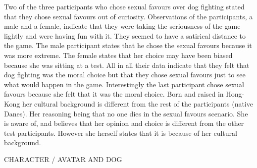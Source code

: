 Two of the three participants who chose sexual favours over dog fighting stated that they chose sexual favours out of curiosity. Observations of the participants, a male and a female, indicate that they were taking the seriousness of the game lightly and were having fun with it. They seemed to have a satirical distance to the game. The male participant states that he chose the sexual favours because it was more extreme. The female states that her choice may have been biased because she was sitting at a test. All in all their data indicate that they felt that dog fighting was the moral choice but that they chose sexual favours just to see what would happen in the game. Interestingly the last participant chose sexual favours because she felt that it was the moral choice. Born and raised in Hong-Kong her cultural background is different from the rest of the participants (native Danes). Her reasoning being that no one dies in the sexual favours scenario. She is aware of, and believes that her opinion and choice is different from the other test participants. However she herself states that it is because of her cultural background.

CHARACTER / AVATAR AND DOG




